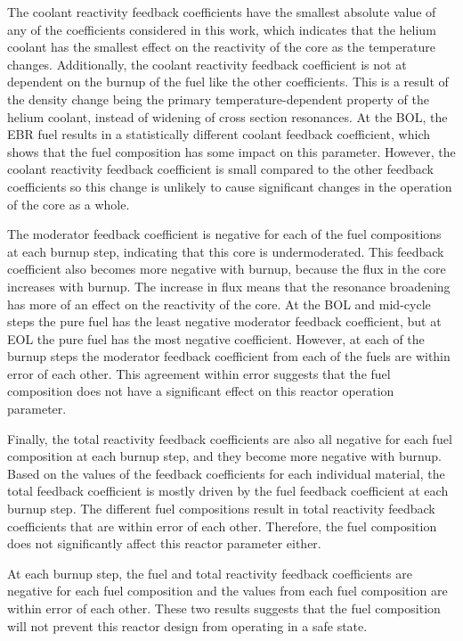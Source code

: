 The coolant reactivity feedback coefficients have the smallest absolute 
value of any of the coefficients considered in this work, which 
indicates that the helium coolant has the smallest effect on the reactivity 
of the core as the temperature changes. Additionally, the coolant 
reactivity feedback coefficient is not at dependent on the burnup of the 
fuel like the other coefficients. This is a result of the density change 
being the primary temperature-dependent property of the helium coolant, 
instead of widening of cross section resonances. 
At the \gls{BOL}, the \gls{EBR} fuel results in a statistically different 
coolant feedback coefficient, which shows that the fuel composition has some 
impact on this parameter. However, the coolant reactivity feedback 
coefficient is small compared to the other feedback coefficients so this 
change is unlikely to cause significant changes in the operation of the 
core as a whole. 

The moderator feedback coefficient is negative for each of the fuel 
compositions at each burnup step, indicating that this core is 
undermoderated. This feedback coefficient also becomes more 
negative with burnup, because the flux in the core increases with 
burnup. The increase in flux means that the resonance broadening has more 
of an effect on the reactivity of the core. At the \gls{BOL} and 
mid-cycle steps the pure fuel has the least negative moderator 
feedback coefficient, but at \gls{EOL} the pure fuel has the most 
negative coefficient. However, at each of the burnup steps the moderator 
feedback coefficient from each of the fuels are within error of each 
other. This agreement within error suggests that the fuel composition 
does not have a significant effect on this reactor operation parameter. 

Finally, the total reactivity feedback coefficients are also all negative 
for each fuel composition at each burnup step, and they become more 
negative with burnup. Based on the values of the feedback 
coefficients for each individual material, the total feedback coefficient 
is mostly driven by the fuel feedback coefficient at each burnup step. 
The different fuel compositions result in total reactivity feedback 
coefficients that are within error of each other. Therefore, the fuel 
composition does not significantly affect this reactor parameter either. 

At each burnup step, the fuel and total reactivity feedback coefficients are 
negative for each fuel composition and the values from each fuel composition 
are within error of each other. These two results suggests that the fuel 
composition will not prevent this reactor design from operating in a safe 
state. 